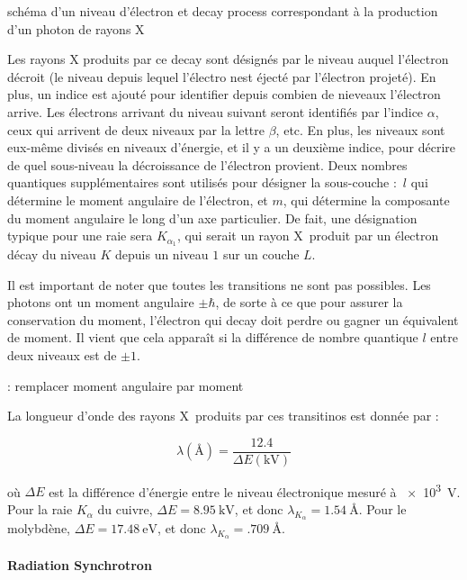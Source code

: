 \begin{marginfigure}
    \TODO
    \caption{schéma d'un niveau d'électron et decay process correspondant à la production d'un photon de rayons X}
    \label{fig:decay}
\end{marginfigure}

Les rayons X produits par ce decay sont désignés par le niveau auquel l'électron décroit (le niveau depuis lequel l'électro nest éjecté par l'électron projeté). En plus, un indice est ajouté pour identifier depuis combien de nieveaux l'électron arrive. Les électrons arrivant du niveau suivant seront identifiés par l'indice $\alpha$, ceux qui arrivent de deux niveaux par la lettre $\beta$, etc. En plus, les niveaux sont eux-même divisés en niveaux d'énergie, et il y a un deuxième indice, pour décrire de quel sous-niveau la décroissance de l'électron provient. Deux nombres quantiques supplémentaires sont utilisés pour désigner la sous-couche : $l$ qui détermine le moment angulaire de l'électron, et $m$, qui détermine la composante du moment angulaire le long d'un axe particulier.
De fait, une désignation typique pour une raie sera $K_{\alpha_1}$, qui serait un rayon X produit par un électron décay du niveau $K$ depuis un niveau $1$ sur un couche $L$.

Il est important de noter que toutes les transitions ne sont pas possibles. Les photons ont un moment angulaire $\pm \hbar$, de sorte à ce que pour assurer la conservation du moment, l'électron qui decay doit perdre ou gagner un équivalent de moment. Il vient que cela apparaît si la différence de nombre quantique $l$ entre deux niveaux est de $\pm 1$.

\TODO: remplacer moment angulaire par moment

La longueur d'onde des rayons X produits par ces transitinos est donnée par :

\begin{equation}
    \lambda (\si{\angstrom}) = \frac{12.4}{\Delta E (\si{\kilo\volt})}
\end{equation}

où $\Delta E $ est la différence d'énergie entre le niveau électronique mesuré à \SI{e3}{\volt}. Pour la raie $K_\alpha$ du cuivre, $\Delta E = \SI{8.95}{\kilo\volt}$, et donc $\lambda_{K_{\alpha}} = \SI{1.54}{\angstrom}$. Pour le molybdène, $\Delta E = \SI{17.48}{\electronvolt}$, et donc $\lambda_{K_\alpha} = \SI{.709}{\angstrom}$.

\paragraph{Radiation Synchrotron}

